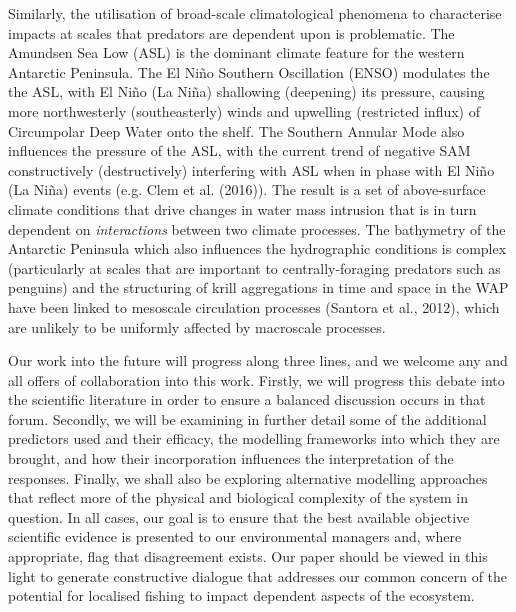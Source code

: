 \documentclass[]{elsarticle} %
\begin{document}
Similarly, the utilisation of broad-scale climatological phenomena to
characterise impacts at scales that predators are dependent upon is
problematic. The Amundsen Sea Low (ASL) is the dominant climate feature
for the western Antarctic Peninsula. The El Niño Southern Oscillation
(ENSO) modulates the the ASL, with El Niño (La Niña) shallowing
(deepening) its pressure, causing more northwesterly (southeasterly)
winds and upwelling (restricted influx) of Circumpolar Deep Water onto
the shelf. The Southern Annular Mode also influences the pressure of the
ASL, with the current trend of negative SAM constructively
(destructively) interfering with ASL when in phase with El Niño (La
Niña) events (e.g. Clem et al. (2016)). The result is a set of
above-surface climate conditions that drive changes in water mass
intrusion that is in turn dependent on \emph{interactions} between two
climate processes. The bathymetry of the Antarctic Peninsula which also
influences the hydrographic conditions is complex (particularly at
scales that are important to centrally-foraging predators such as
penguins) and the structuring of krill aggregations in time and space in
the WAP have been linked to mesoscale circulation processes (Santora et
al., 2012), which are unlikely to be uniformly affected by macroscale
processes.

Our work into the future will progress along three lines, and we welcome
any and all offers of collaboration into this work. Firstly, we will
progress this debate into the scientific literature in order to ensure a
balanced discussion occurs in that forum. Secondly, we will be examining
in further detail some of the additional predictors used and their
efficacy, the modelling frameworks into which they are brought, and how
their incorporation influences the interpretation of the responses.
Finally, we shall also be exploring alternative modelling approaches
that reflect more of the physical and biological complexity of the
system in question. In all cases, our goal is to ensure that the best
available objective scientific evidence is presented to our
environmental managers and, where appropriate, flag that disagreement
exists. Our paper should be viewed in this light to generate
constructive dialogue that addresses our common concern of the potential
for localised fishing to impact dependent aspects of the ecosystem.\\
\newpage  
\end{document}
